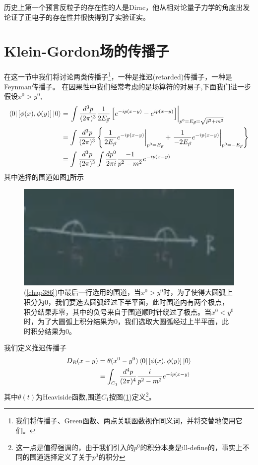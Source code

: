 历史上第一个预言反粒子的存在性的人是Dirac，他从相对论量子力学的角度出发论证了正电子的存在性并很快得到了实验证实。
\section{Klein-Gordon场的传播子}
在这一节中我们将讨论两类传播子\footnote{我们将传播子、Green函数、两点关联函数视作同义词，并将交替地使用它们。}，一种是推迟(retarded)传播子，一种是Feynman传播子。
在因果性中我们经常考虑的是场算符的对易子,下面我们进一步假设$x^{0}>y^{0}$,
\begin{equation}
\label{chap386}
\begin{aligned}
 \bra{0}\left[\phi(x),\phi(y)\right]\ket{0}
    &=\left.\int\frac{d^{3}p}{(2\pi)^{3}}\frac{1}{2E_{\vec{p}}}\left[e^{-ip(x-y)}-e^{ip(x-y)}\right]\right|_{p^{0}=E_{\vec{p}}=\sqrt{\vec{p}^{2}+m^{2}}}\\
    &=\int\frac{d^{3}p}{(2\pi)^{3}}\left\{\left.\frac{1}{2E_{\vec{p}}}e^{-ip(x-y)}\right|_{p^{0}=E_{\vec{p}}}+\left.\frac{1}{-2E_{\vec{p}}}e^{-ip(x-y)}\right|_{p^{0}=-E_{\vec{p}}}\right\}\\
    &=\int\frac{d^{3}p}{(2\pi)^{3}}\int \frac{dp^{0}}{2\pi i}\frac{-1}{p^{2}-m^{2}}e^{-ip(x-y)}
    \end{aligned}
    \end{equation}
    其中选择的围道如图\ref{fig2}所示
    \begin{figure}[htbp]
        \centering
        \includegraphics{img/chap3_1.png}
        \caption{(\ref{chap386})中最后一行选用的围道，当$x^{0}>y^{0}$时，为了使得大圆弧上积分为0，我们要选去圆弧经过下半平面，此时围道内有两个极点，积分结果非零，其中的负号来自于围道顺时针绕过了极点。当$x^{0}<y^{0}$时，为了大圆弧上积分结果为0，我们选取大圆弧经过上半平面，此时积分结果为0。}
        \label{fig2}
    \end{figure}
    
我们定义推迟传播子
\begin{equation}
\label{chap3retarded}
\begin{aligned}
        D_{R}(x-y)&=\theta(x^{0}-y^{0})\bra{0}\left[\phi(x),\phi(y)\right]\ket{0}\\
        &=\int_{C_{1}} \frac{d^{4}p}{(2\pi)^{4}}\frac{i}{p^{2}-m^{2}}e^{-ip(x-y)}
\end{aligned}
\end{equation}
其中$\theta(t)$为Heaviside函数,围道$C_{1}$按图(\ref{fig2})定义\footnote{这一点是值得强调的，由于我们引入的$p^{0}$的积分本身是ill-define的，事实上不同的围道选择定义了关于$p^{0}$的积分}。


